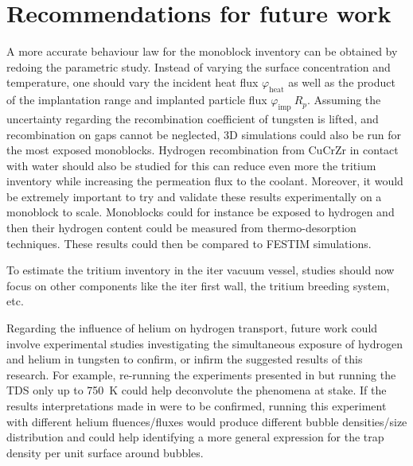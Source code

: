 \section*{Recommendations for future work}

A more accurate behaviour law for the monoblock inventory can be obtained by redoing the parametric study.
Instead of varying the surface concentration and temperature, one should vary the incident heat flux $\varphi_\mathrm{heat}$ as well as the product of the implantation range and implanted particle flux $\varphi_\mathrm{imp} \ R_p$.
Assuming the uncertainty regarding the recombination coefficient of tungsten is lifted, and recombination on gaps cannot be neglected, 3D simulations could also be run for the most exposed monoblocks.
Hydrogen recombination from CuCrZr in contact with water should also be studied for this can reduce even more the tritium inventory while increasing the \gls{permeation} flux to the coolant.
Moreover, it would be extremely important to try and validate these results experimentally on a monoblock to scale.
Monoblocks could for instance be exposed to hydrogen and then their hydrogen content could be measured from thermo-desorption techniques.
These results could then be compared to FESTIM simulations.

To estimate the tritium inventory in the \gls{iter} vacuum vessel, studies should now focus on other components like the \gls{iter} \gls{first wall}, the tritium breeding system, etc.

Regarding the influence of helium on hydrogen transport, future work could involve experimental studies investigating the simultaneous exposure of hydrogen and helium in tungsten to confirm, or infirm the suggested results of this research.
For example, re-running the experiments presented in  but running the TDS only up to \SI{750}{K} could help deconvolute the phenomena at stake.
If the results interpretations made in  were to be confirmed, running this experiment with different helium fluences/fluxes would produce different bubble densities/size distribution and could help identifying a more general expression for the trap density per unit surface around bubbles.
